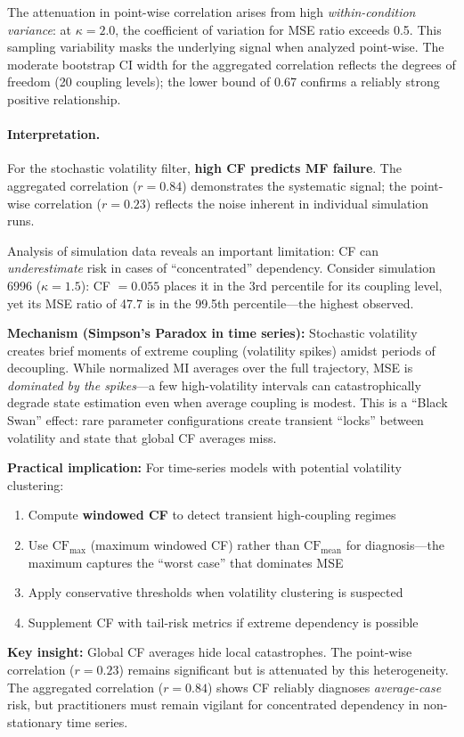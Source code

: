 \documentclass[10pt]{article} %
\theoremstyle{plain}
\theoremstyle{definition}
\begin{document}
\noindent The attenuation in point-wise correlation arises from high \emph{within-condition variance}: at $\kappa = 2.0$, the coefficient of variation for MSE ratio exceeds 0.5. This sampling variability masks the underlying signal when analyzed point-wise. The moderate bootstrap CI width for the aggregated correlation reflects the degrees of freedom (20 coupling levels); the lower bound of 0.67 confirms a reliably strong positive relationship.

\paragraph{Interpretation.} For the stochastic volatility filter, \textbf{high CF predicts MF failure}. The aggregated correlation ($r = 0.84$) demonstrates the systematic signal; the point-wise correlation ($r = 0.23$) reflects the noise inherent in individual simulation runs.

\begin{tcolorbox}[breakable, colback=gray!10, colframe=black, title=\textbf{The Volatility Trap: A Second-Order Insight}, fonttitle=\bfseries]
Analysis of simulation data reveals an important limitation: CF can \emph{underestimate} risk in cases of ``concentrated'' dependency. Consider simulation 6996 ($\kappa = 1.5$): CF $= 0.055$ places it in the 3rd percentile for its coupling level, yet its MSE ratio of 47.7 is in the 99.5th percentile---the highest observed.

\textbf{Mechanism (Simpson's Paradox in time series):} Stochastic volatility creates brief moments of extreme coupling (volatility spikes) amidst periods of decoupling. While normalized MI averages over the full trajectory, MSE is \emph{dominated by the spikes}---a few high-volatility intervals can catastrophically degrade state estimation even when average coupling is modest. This is a ``Black Swan'' effect: rare parameter configurations create transient ``locks'' between volatility and state that global CF averages miss.

\textbf{Practical implication:} For time-series models with potential volatility clustering:
\begin{enumerate}
    \item Compute \textbf{windowed CF} to detect transient high-coupling regimes
    \item Use $\text{CF}_{\max}$ (maximum windowed CF) rather than $\text{CF}_{\text{mean}}$ for diagnosis---the maximum captures the ``worst case'' that dominates MSE
    \item Apply conservative thresholds when volatility clustering is suspected
    \item Supplement CF with tail-risk metrics if extreme dependency is possible
\end{enumerate}

\textbf{Key insight:} Global CF averages hide local catastrophes. The point-wise correlation ($r = 0.23$) remains significant but is attenuated by this heterogeneity. The aggregated correlation ($r = 0.84$) shows CF reliably diagnoses \emph{average-case} risk, but practitioners must remain vigilant for concentrated dependency in non-stationary time series.
\end{tcolorbox}
\end{document}
